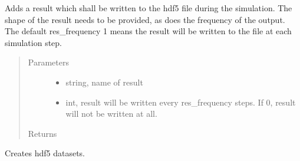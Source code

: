 \documentclass[letterpaper,10pt,english]{sphinxmanual}
\begin{document}
\begin{itemize}
\begin{fulllineitems}
\begin{fulllineitems}
\begin{quote}
\begin{description}
\end{description}\end{quote}

\end{fulllineitems}


\begin{fulllineitems}
\label{\detokenize{simulator:nbody.simulator.simulation.SimulationBase.add_result}}
\sphinxAtStartPar
Adds a result which shall be written to the hdf5 file during the simulation. The shape
of the result needs to be provided, as does the frequency of the output. The default res\_frequency
1 means the result will be written to the file at each simulation step.
\begin{quote}\begin{description}
\item[{Parameters}] \leavevmode\begin{itemize}
\item {} 
\sphinxAtStartPar
{} \textendash{} string, name of result

\item {} 
\sphinxAtStartPar
{} \textendash{} int, result will be written every res\_frequency steps. If 0, result will not
be written at all.

\end{itemize}

\item[{Returns}] \leavevmode
\sphinxAtStartPar


\end{description}\end{quote}

\end{fulllineitems}


\begin{fulllineitems}
\label{\detokenize{simulator:nbody.simulator.simulation.SimulationBase.create_datasets}}
\sphinxAtStartPar
Creates hdf5 datasets.


\end{fulllineitems}
\end{fulllineitems}
\end{itemize}
\end{document}
